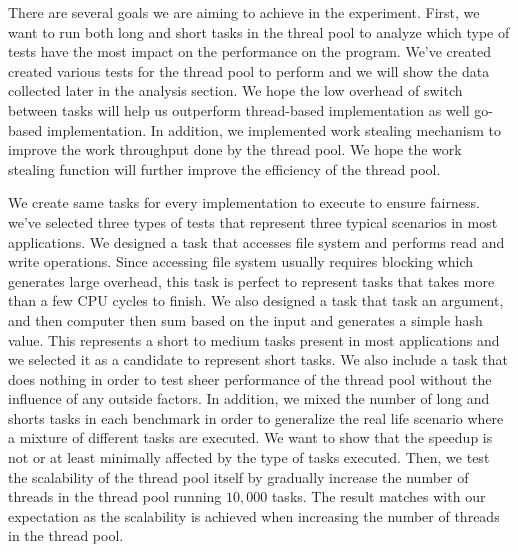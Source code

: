 \documentclass[journal, a4paper]{IEEEtran}
\begin{document}
There are several goals we are aiming to achieve in the experiment. First, we want to run both long and short tasks in the threal pool to analyze which type of tests have the most impact on the performance on the program. We've created created various tests for the thread pool to perform and we will show the data collected later in the analysis section. We hope the low overhead of switch between tasks will help us outperform thread-based implementation as well go-based implementation. In addition, we implemented work stealing mechanism to improve the work throughput done by the thread pool. We hope the work stealing function will further improve the efficiency of the thread pool. 	
	

We create same tasks for every implementation to execute to ensure fairness. we've selected three types of tests that represent three typical scenarios in most applications. We designed a task that accesses file system and performs read and write operations. Since accessing file system usually requires blocking which generates large overhead, this task is perfect to represent tasks that takes more than a few CPU cycles to finish. We also designed a task that task an argument, and then computer then sum based on the input and generates a simple hash value. This represents a short to medium tasks present in most applications and we selected it as a candidate to represent short tasks. We also include a task that does nothing in order to test sheer performance of the thread pool without the influence of any outside factors. In addition, we mixed the number of long and shorts tasks in each benchmark in order to generalize the real life scenario where a mixture of different tasks are executed. We want to show that the speedup is not or at least minimally affected by the type of tasks executed. Then, we test the scalability of the thread pool itself by gradually increase the number of threads in the thread pool running $10,000$ tasks. The result matches with our expectation as the scalability is achieved when increasing the number of threads in the thread pool.\\
\end{document}
